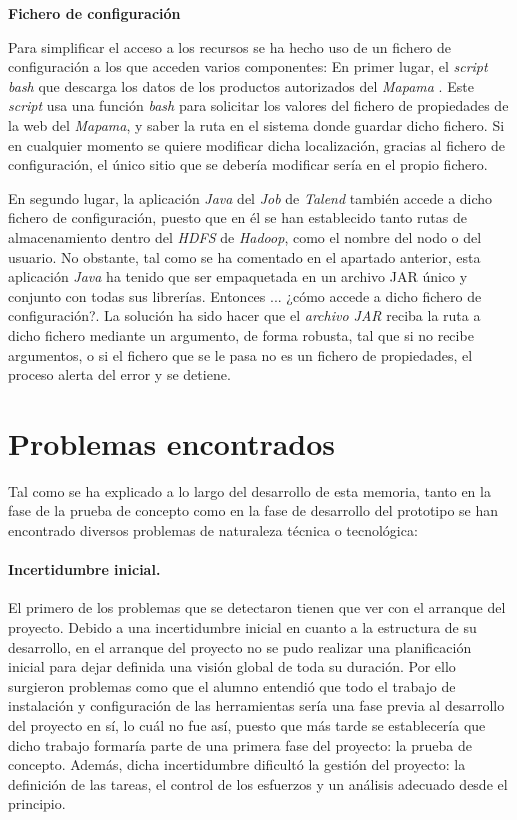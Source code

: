 \par 
\textbf{Fichero de configuración}
\bigskip
\par
Para simplificar el acceso a los recursos se ha hecho uso de un fichero de configuración a los que acceden varios componentes: En primer lugar, el \textit{script bash} que descarga los datos de los productos autorizados del \textit{Mapama} \cite{mapama}. Este \textit{script} usa una función \textit{bash} para solicitar los valores del fichero de propiedades de la web del \textit{Mapama}, y saber la ruta en el sistema donde guardar dicho fichero. Si en cualquier momento se quiere modificar dicha localización, gracias al fichero de configuración, el único sitio que se debería modificar sería en el propio fichero. 
\par En segundo lugar, la aplicación \textit{Java} del \textit{Job} de \textit{Talend} también accede a dicho fichero de configuración, puesto que en él se han establecido tanto rutas de almacenamiento dentro del \textit{HDFS} de \textit{Hadoop}, como el nombre del nodo o del usuario. No obstante, tal como se ha comentado en el apartado anterior, esta aplicación \textit{Java} ha tenido que ser empaquetada en un archivo JAR único y conjunto con todas sus librerías. Entonces ... ¿cómo accede a dicho fichero de configuración?. La solución ha sido hacer que el \textit{archivo JAR} reciba la ruta a dicho fichero mediante un argumento, de forma robusta, tal que si no recibe argumentos, o si el fichero que se le pasa no es un fichero de propiedades, el proceso alerta del error y se detiene. 
\bigskip


\section{Problemas encontrados} \label{implementacion.problemas}
\par
Tal como se ha explicado a lo largo del desarrollo de esta memoria, tanto en la fase de la prueba de concepto como en la fase de desarrollo del prototipo se han encontrado diversos problemas de naturaleza técnica o tecnológica:

\paragraph*{Incertidumbre inicial.} El primero de los problemas que se detectaron tienen que ver con el arranque del proyecto. Debido a una incertidumbre inicial en cuanto a la estructura de su desarrollo, en el arranque del proyecto no se pudo realizar una planificación inicial para dejar definida una visión global de toda su duración. Por ello surgieron problemas como que el alumno entendió que todo el trabajo de instalación y configuración de las herramientas sería una fase previa al desarrollo del proyecto en sí, lo cuál no fue así, puesto que más tarde se establecería que dicho trabajo formaría parte de una primera fase del proyecto: la prueba de concepto. Además, dicha incertidumbre dificultó la gestión del proyecto: la definición de las tareas, el control de los esfuerzos y un análisis adecuado desde el principio.

